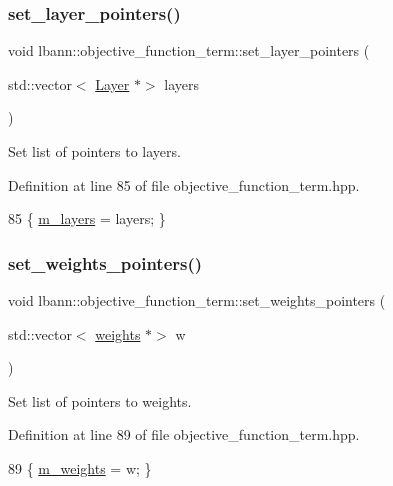 \subsubsection{\texorpdfstring{set\+\_\+layer\+\_\+pointers()}{set\_layer\_pointers()}}
{\footnotesize\ttfamily void lbann\+::objective\+\_\+function\+\_\+term\+::set\+\_\+layer\+\_\+pointers (\begin{DoxyParamCaption}\item[{std\+::vector$<$ \hyperlink{classlbann_1_1Layer}{Layer} $\ast$$>$}]{layers }\end{DoxyParamCaption})\hspace{0.3cm}{\ttfamily [inline]}}

Set list of pointers to layers. 

Definition at line 85 of file objective\+\_\+function\+\_\+term.\+hpp.


\begin{DoxyCode}
85 \{ \hyperlink{classlbann_1_1objective__function__term_a9269cf0a237eacd1e220ba2739f44334}{m\_layers} = layers; \}
\end{DoxyCode}
\mbox{\label{classlbann_1_1objective__function__term_aa8adaf01dd8bc535dd86f27fc53c276a}} 
\subsubsection{\texorpdfstring{set\+\_\+weights\+\_\+pointers()}{set\_weights\_pointers()}}
{\footnotesize\ttfamily void lbann\+::objective\+\_\+function\+\_\+term\+::set\+\_\+weights\+\_\+pointers (\begin{DoxyParamCaption}\item[{std\+::vector$<$ \hyperlink{classlbann_1_1weights}{weights} $\ast$$>$}]{w }\end{DoxyParamCaption})\hspace{0.3cm}{\ttfamily [inline]}}

Set list of pointers to weights. 

Definition at line 89 of file objective\+\_\+function\+\_\+term.\+hpp.


\begin{DoxyCode}
89 \{ \hyperlink{classlbann_1_1objective__function__term_a1d601c29153ae9cb54c585887608f2bf}{m\_weights} = w; \}
\end{DoxyCode}
\mbox{\label{classlbann_1_1objective__function__term_a6c8dbdf18aac8676098189fb7b178e91}} 

